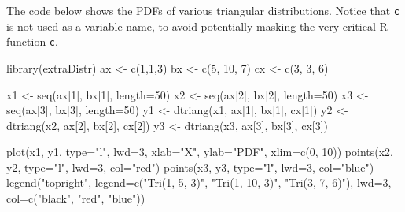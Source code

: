\documentclass[
  13,
  letterpaper,
]{report}
\newenvironment{Shaded}{\begin{snugshade}}{\end{snugshade}}
\newcommand{\AttributeTok}[1]{\textcolor[rgb]{0.40,0.45,0.13}{#1}}
\newcommand{\DecValTok}[1]{\textcolor[rgb]{0.68,0.00,0.00}{#1}}
\newcommand{\FunctionTok}[1]{\textcolor[rgb]{0.28,0.35,0.67}{#1}}
\newcommand{\NormalTok}[1]{\textcolor[rgb]{0.00,0.23,0.31}{#1}}
\newcommand{\OtherTok}[1]{\textcolor[rgb]{0.00,0.23,0.31}{#1}}
\newcommand{\StringTok}[1]{\textcolor[rgb]{0.13,0.47,0.30}{#1}}
\begin{document}
The code below shows the PDFs of various triangular distributions.
Notice that \texttt{c} is not used as a variable name, to avoid
potentially masking the very critical R function \texttt{c}.

\begin{Shaded}
\begin{Highlighting}[]
\FunctionTok{library}\NormalTok{(extraDistr)}
\NormalTok{ax }\OtherTok{\textless{}{-}} \FunctionTok{c}\NormalTok{(}\DecValTok{1}\NormalTok{,}\DecValTok{1}\NormalTok{,}\DecValTok{3}\NormalTok{)}
\NormalTok{bx }\OtherTok{\textless{}{-}} \FunctionTok{c}\NormalTok{(}\DecValTok{5}\NormalTok{, }\DecValTok{10}\NormalTok{, }\DecValTok{7}\NormalTok{)}
\NormalTok{cx }\OtherTok{\textless{}{-}} \FunctionTok{c}\NormalTok{(}\DecValTok{3}\NormalTok{, }\DecValTok{3}\NormalTok{, }\DecValTok{6}\NormalTok{)}

\NormalTok{x1 }\OtherTok{\textless{}{-}} \FunctionTok{seq}\NormalTok{(ax[}\DecValTok{1}\NormalTok{], bx[}\DecValTok{1}\NormalTok{], }\AttributeTok{length=}\DecValTok{50}\NormalTok{)}
\NormalTok{x2 }\OtherTok{\textless{}{-}} \FunctionTok{seq}\NormalTok{(ax[}\DecValTok{2}\NormalTok{], bx[}\DecValTok{2}\NormalTok{], }\AttributeTok{length=}\DecValTok{50}\NormalTok{)}
\NormalTok{x3 }\OtherTok{\textless{}{-}} \FunctionTok{seq}\NormalTok{(ax[}\DecValTok{3}\NormalTok{], bx[}\DecValTok{3}\NormalTok{], }\AttributeTok{length=}\DecValTok{50}\NormalTok{)}
\NormalTok{y1 }\OtherTok{\textless{}{-}} \FunctionTok{dtriang}\NormalTok{(x1, ax[}\DecValTok{1}\NormalTok{], bx[}\DecValTok{1}\NormalTok{], cx[}\DecValTok{1}\NormalTok{])}
\NormalTok{y2 }\OtherTok{\textless{}{-}} \FunctionTok{dtriang}\NormalTok{(x2, ax[}\DecValTok{2}\NormalTok{], bx[}\DecValTok{2}\NormalTok{], cx[}\DecValTok{2}\NormalTok{])}
\NormalTok{y3 }\OtherTok{\textless{}{-}} \FunctionTok{dtriang}\NormalTok{(x3, ax[}\DecValTok{3}\NormalTok{], bx[}\DecValTok{3}\NormalTok{], cx[}\DecValTok{3}\NormalTok{])}

\FunctionTok{plot}\NormalTok{(x1, y1, }\AttributeTok{type=}\StringTok{"l"}\NormalTok{, }\AttributeTok{lwd=}\DecValTok{3}\NormalTok{, }\AttributeTok{xlab=}\StringTok{"X"}\NormalTok{, }\AttributeTok{ylab=}\StringTok{"PDF"}\NormalTok{,}
     \AttributeTok{xlim=}\FunctionTok{c}\NormalTok{(}\DecValTok{0}\NormalTok{, }\DecValTok{10}\NormalTok{))}
\FunctionTok{points}\NormalTok{(x2, y2, }\AttributeTok{type=}\StringTok{"l"}\NormalTok{, }\AttributeTok{lwd=}\DecValTok{3}\NormalTok{, }\AttributeTok{col=}\StringTok{"red"}\NormalTok{)}
\FunctionTok{points}\NormalTok{(x3, y3, }\AttributeTok{type=}\StringTok{"l"}\NormalTok{, }\AttributeTok{lwd=}\DecValTok{3}\NormalTok{, }\AttributeTok{col=}\StringTok{"blue"}\NormalTok{)}
\FunctionTok{legend}\NormalTok{(}\StringTok{"topright"}\NormalTok{, }\AttributeTok{legend=}\FunctionTok{c}\NormalTok{(}\StringTok{"Tri(1, 5, 3)"}\NormalTok{, }\StringTok{"Tri(1, 10, 3)"}\NormalTok{, }\StringTok{"Tri(3, 7, 6)"}\NormalTok{), }
       \AttributeTok{lwd=}\DecValTok{3}\NormalTok{, }\AttributeTok{col=}\FunctionTok{c}\NormalTok{(}\StringTok{"black"}\NormalTok{, }\StringTok{"red"}\NormalTok{, }\StringTok{"blue"}\NormalTok{))}
\end{Highlighting}
\end{Shaded}
\end{document}
